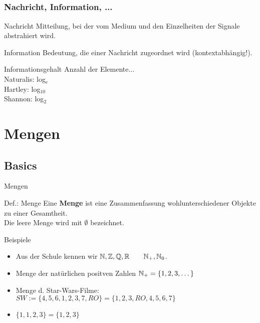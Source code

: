 \subsection{}
	\begin{frame}
		\frametitle{Nachricht, Information, ...}
			\begin{block}{Nachricht}
			      Mitteilung, bei der vom Medium und den Einzelheiten der Signale abstrahiert wird.
			\end{block}
		\pause
			\begin{block}{Information}
		    	  Bedeutung, die einer Nachricht zugeordnet wird (kontextabhängig!).
			\end{block}
		\pause
			\begin{block}{Informationsgehalt}
				Anzahl der Elemente... \\
		     	Naturalis: log$_{e}$ \\
		      	Hartley: log$_{10}$ \\
		      	Shannon: log$_{2}$
		\end{block}
	\end{frame}

\section{Mengen}
\subsection{Basics}
	\begin{frame}{Mengen}
		\begin{block}{Def.: Menge}
			Eine \textbf{Menge} ist eine Zusammenfassung wohlunterschiedener Objekte zu einer Gesamtheit.\\
			Die leere Menge wird mit $\emptyset$ bezeichnet.\\
		\end{block}
		\pause
		\begin{exampleblock}{Beispiele}
			\begin{itemize}
				\item Aus der Schule kennen wir \qquad $\mathbb{N}, \mathbb{Z}, \mathbb{Q}, \mathbb{R} \qquad \mathbb{N}_+, \mathbb{N}_0$.
				\item Menge der natürlichen positven Zahlen $\mathbb{N}_+ = \{1,2,3,\dots\}$
				\item Menge d. Star-Wars-Filme: $SW:=\{4,5,6,1,2,3,7,RO\} = \{1,2,3,RO,4,5,6,7\}$
				\item $\{1,1,2,3\} = \{1,2,3\}$
			\end{itemize}
		\end{exampleblock}
	\end{frame}

